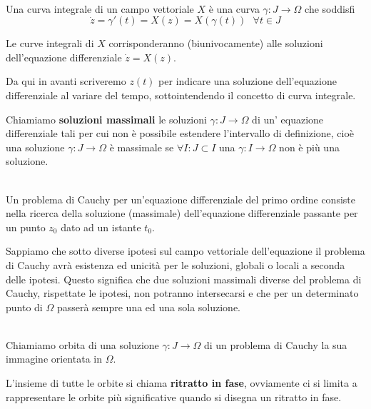 \documentclass[11pt,a4paper,twoside]{book}
\newenvironment{definizione}[1][\empty]{\begin{Definizione}{
\ifx\empty#1\relax\else\mdseries\itshape#1\\\fi
}{}}{\end{Definizione}}
\theoremstyle{esss}
\theoremstyle{dotless}
\numberwithin{equation}{section} %
\begin{document}
\begin{definizione}
Una curva integrale di un campo vettoriale $X$ è una curva $\gamma:J\rightarrow\Omega$ che soddisfi
\[
\dot{z}=\gamma '(t)= X(z) = X(\gamma(t)) \> \> \> \forall t\in J
\]
\end{definizione}

Le curve integrali di $X$ corrisponderanno (biunivocamente) alle soluzioni dell'equazione differenziale $\dot{z}=X(z)$.

Da qui in avanti scriveremo $z(t)$ per indicare una soluzione dell'equazione differenziale al variare del tempo, sottointendendo il concetto di curva integrale.

Chiamiamo \textbf{soluzioni massimali} le soluzioni $\gamma:J\rightarrow\Omega$ di un' equazione differenziale tali per cui non è possibile estendere l'intervallo di definizione, cioè una soluzione $\gamma:J\rightarrow\Omega$ è massimale se $\forall I : J\subset I$ una $\gamma:I\rightarrow\Omega$ non è più una soluzione.

\begin{definizione}
Un problema di Cauchy per un'equazione differenziale del primo ordine consiste nella ricerca della soluzione (massimale) dell'equazione differenziale passante per un punto $z_0$ dato ad un istante $t_0$.
\end{definizione}

Sappiamo che sotto diverse ipotesi sul campo vettoriale dell'equazione il problema di Cauchy avrà esistenza ed unicità per le soluzioni, globali o locali a seconda delle ipotesi. Questo significa che due soluzioni massimali diverse del problema di Cauchy, rispettate le ipotesi, non potranno intersecarsi e che per un determinato punto di $\Omega$ passerà sempre una ed una sola soluzione.

\begin{definizione}
Chiamiamo orbita di una soluzione $\gamma:J\rightarrow\Omega$ di un problema di Cauchy la sua immagine orientata in $\Omega$. 
\end{definizione}

L'insieme di tutte le orbite si chiama \textbf{ritratto in fase}, ovviamente ci si limita a rappresentare le orbite più significative quando si disegna un ritratto in fase.
\end{document}
